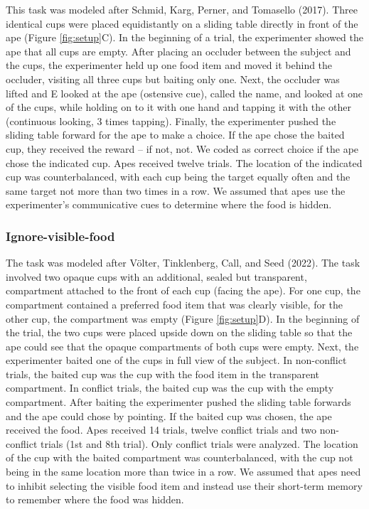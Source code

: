 \documentclass[
  man,floatsintext]{apa6}
\begin{document}
This task was modeled after Schmid, Karg, Perner, and Tomasello (2017). Three identical cups were placed equidistantly on a sliding table directly in front of the ape (Figure \ref{fig:setup}C). In the beginning of a trial, the experimenter showed the ape that all cups are empty. After placing an occluder between the subject and the cups, the experimenter held up one food item and moved it behind the occluder, visiting all three cups but baiting only one. Next, the occluder was lifted and E looked at the ape (ostensive cue), called the name, and looked at one of the cups, while holding on to it with one hand and tapping it with the other (continuous looking, 3 times tapping). Finally, the experimenter pushed the sliding table forward for the ape to make a choice. If the ape chose the baited cup, they received the reward -- if not, not. We coded as correct choice if the ape chose the indicated cup. Apes received twelve trials. The location of the indicated cup was counterbalanced, with each cup being the target equally often and the same target not more than two times in a row. We assumed that apes use the experimenter's communicative cues to determine where the food is hidden.

\hypertarget{ignore-visible-food}{%
\subsubsection{Ignore-visible-food}\label{ignore-visible-food}}

The task was modeled after Völter, Tinklenberg, Call, and Seed (2022). The task involved two opaque cups with an additional, sealed but transparent, compartment attached to the front of each cup (facing the ape). For one cup, the compartment contained a preferred food item that was clearly visible, for the other cup, the compartment was empty (Figure \ref{fig:setup}D). In the beginning of the trial, the two cups were placed upside down on the sliding table so that the ape could see that the opaque compartments of both cups were empty. Next, the experimenter baited one of the cups in full view of the subject. In non-conflict trials, the baited cup was the cup with the food item in the transparent compartment. In conflict trials, the baited cup was the cup with the empty compartment. After baiting the experimenter pushed the sliding table forwards and the ape could chose by pointing. If the baited cup was chosen, the ape received the food. Apes received 14 trials, twelve conflict trials and two non-conflict trials (1st and 8th trial). Only conflict trials were analyzed. The location of the cup with the baited compartment was counterbalanced, with the cup not being in the same location more than twice in a row. We assumed that apes need to inhibit selecting the visible food item and instead use their short-term memory to remember where the food was hidden.
\end{document}
